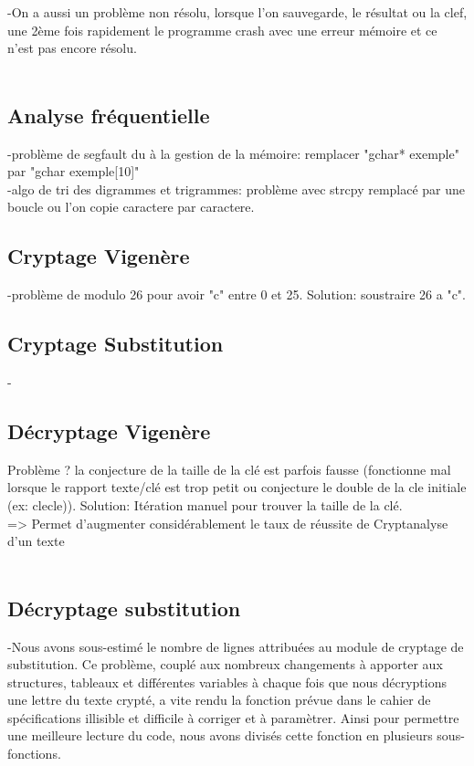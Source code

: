 \documentclass[a4]{article}
\begin{document}
	-On a aussi un problème non résolu, lorsque l'on sauvegarde, le résultat ou la clef, une 2ème fois rapidement le programme crash 
	avec une erreur mémoire et ce n'est pas encore résolu.\\
	\\
	
	\subsection{Analyse fréquentielle}
	-problème de segfault du à la gestion de la mémoire: remplacer "gchar* exemple" par "gchar exemple[10]"\\
	-algo de tri des digrammes et trigrammes: problème avec strcpy remplacé par une boucle ou l'on copie caractere par caractere.
	
	\subsection{Cryptage Vigenère}
	-problème de modulo 26 pour avoir "c" entre 0 et 25. Solution: soustraire 26 a "c".
	\subsection{Cryptage Substitution}
	-
	\subsection{Décryptage Vigenère}
	Problème ? la conjecture de la taille de la clé est parfois fausse (fonctionne mal lorsque le rapport
		texte/clé est trop petit ou conjecture le double de la cle initiale (ex: clecle)).
		Solution: Itération manuel pour trouver la taille de la clé.\\
		=> Permet d'augmenter considérablement le taux de réussite de Cryptanalyse d'un texte \\ \\
	
	\subsection{Décryptage substitution}
	 -Nous avons sous-estimé le nombre de lignes attribuées au module de cryptage de substitution.
	  Ce problème, couplé aux nombreux changements à apporter aux structures, tableaux et différentes
	  variables à chaque fois que nous décryptions une lettre du texte crypté, a vite rendu la fonction
	  prévue dans le cahier de spécifications illisible et difficile à corriger et à paramètrer. Ainsi 
	  pour permettre une meilleure lecture du code, nous avons divisés cette fonction en plusieurs sous-fonctions. \\ \\
    
\end{document}
